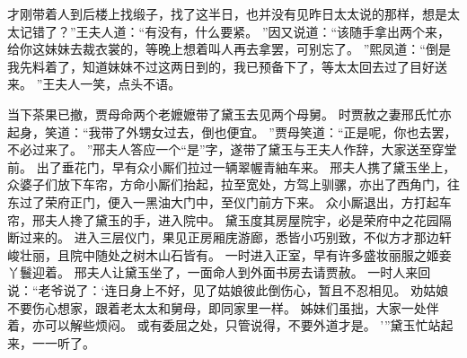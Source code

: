 才刚带着人到后楼上找缎子，找了这半日，也并没有见昨日太太说的那样，想是太太记错了？”王夫人道：“有没有，什么要紧。
”因又说道：“该随手拿出两个来，给你这妹妹去裁衣裳的，等晚上想着叫人再去拿罢，可别忘了。
”熙凤道：“倒是我先料着了，知道妹妹不过这两日到的，我已预备下了，等太太回去过了目好送来。
”王夫人一笑，点头不语。
\par

当下茶果已撤，贾母命两个老嬷嬷带了黛玉去见两个母舅。
时贾赦之妻邢氏忙亦起身，笑道：“我带了外甥女过去，倒也便宜。
”贾母笑道：“正是呢，你也去罢，不必过来了。
”邢夫人答应一个“是”字，遂带了黛玉与王夫人作辞，大家送至穿堂前。
出了垂花门，早有众小厮们拉过一辆翠幄青紬车来。
邢夫人携了黛玉坐上，众婆子们放下车帘，方命小厮们抬起，拉至宽处，方驾上驯骡，亦出了西角门，往东过了荣府正门，便入一黑油大门中，至仪门前方下来。
众小厮退出，方打起车帘，邢夫人搀了黛玉的手，进入院中。
黛玉度其房屋院宇，必是荣府中之花园隔断过来的。
进入三层仪门，果见正房厢庑游廊，悉皆小巧别致，不似方才那边轩峻壮丽，且院中随处之树木山石皆有。
一时进入正室，早有许多盛妆丽服之姬妾丫鬟迎着。
邢夫人让黛玉坐了，一面命人到外面书房去请贾赦。
一时人来回说：“老爷说了：‘连日身上不好，见了姑娘彼此倒伤心，暂且不忍相见。
劝姑娘不要伤心想家，跟着老太太和舅母，即同家里一样。
姊妹们虽拙，大家一处伴着，亦可以解些烦闷。
或有委屈之处，只管说得，不要外道才是。
’”黛玉忙站起来，一一听了。
